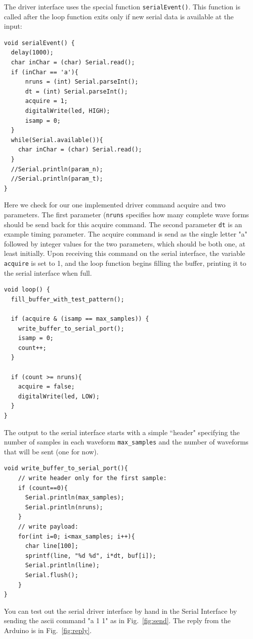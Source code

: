 \documentclass[12pt]{article}
\begin{document}
The driver interface uses the special function {\tt serialEvent()}.  This function is called after the loop function exits only if new serial data is available at the input:
\begin{verbatim}
void serialEvent() {
  delay(1000);
  char inChar = (char) Serial.read();
  if (inChar == 'a'){
      nruns = (int) Serial.parseInt();
      dt = (int) Serial.parseInt();        
      acquire = 1;
      digitalWrite(led, HIGH);
      isamp = 0;
  }
  while(Serial.available()){
    char inChar = (char) Serial.read();  
  }
  //Serial.println(param_n);
  //Serial.println(param_t);
}
\end{verbatim}
Here we check for our one implemented driver command acquire and two parameters.  The first parameter ({\tt nruns} specifies how many complete wave forms should be send back for this acquire command.  The second parameter {\tt dt} is an example timing parameter.   The acquire command is send as the single letter "a" followed by integer values for the two parameters, which should be both one, at least initially.
Upon receiving this command on the serial interface, the variable {\tt acquire} is set to 1, and the loop function begins filling the buffer, printing it to the serial interface when full.
\begin{verbatim}
void loop() {    
  fill_buffer_with_test_pattern();
  
  if (acquire & (isamp == max_samples)) {
    write_buffer_to_serial_port();
    isamp = 0;    
    count++;
  }

  if (count >= nruns){
    acquire = false;
    digitalWrite(led, LOW);
  }
}
\end{verbatim}
The output to the serial interface starts with a simple ``header" specifying the number of samples in each waveform {\tt max\_samples} and the number of waveforms that will be sent (one for now). 
\begin{verbatim}
void write_buffer_to_serial_port(){
    // write header only for the first sample:
    if (count==0){
      Serial.println(max_samples);
      Serial.println(nruns);
    }
    // write payload:
    for(int i=0; i<max_samples; i++){
      char line[100];
      sprintf(line, "%d %d", i*dt, buf[i]);
      Serial.println(line);
      Serial.flush();
    }
}
\end{verbatim}


You can test out the serial driver interface by hand in the Serial Interface by sending the ascii command "a 1 1" as in Fig.~\ref{fig:send}.  The reply from the Arduino is in  Fig.~\ref{fig:reply}.
\end{document}
